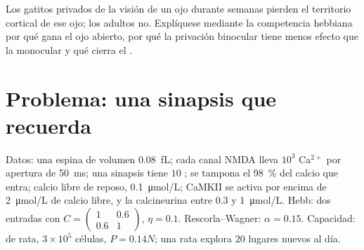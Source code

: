 \begin{exercise}[$\star\star\star$]\label{exo:b3:learning-memory:12}
Los gatitos privados de la visión de un ojo durante semanas pierden el
territorio cortical de ese ojo; los adultos no. Explíquese mediante la
competencia hebbiana por qué gana el ojo abierto, por qué la privación
binocular tiene menos efecto que la monocular y qué cierra el .
\end{exercise}

\section{Problema: una sinapsis que recuerda}

\begin{problem}
\label{pb:b3:learning-memory:1}
Datos: una espina de volumen \qty{0.08}{fL}; cada canal NMDA lleva
$10^{3}$ Ca$^{2+}$ por apertura de \qty{50}{ms}; una sinapsis tiene
$10$ ; se tampona el \qty{98}{\%} del calcio que entra;
calcio libre de reposo, \qty{0.1}{\micro mol/L}; CaMKII se activa por
encima de \qty{2}{\micro mol/L} de calcio libre, y la calcineurina
entre $0.3$ y \qty{1}{\micro mol/L}. Hebb: dos entradas con $C = \begin{pmatrix}1 &
0.6\\ 0.6 & 1\end{pmatrix}$, $\eta = 0.1$. Rescorla--Wagner: $\alpha =
0.15$. Capacidad:  de rata, $3\times 10^{5}$ células, $P = 0.14N$;
una rata explora $20$ lugares nuevos al día.


\end{problem}
